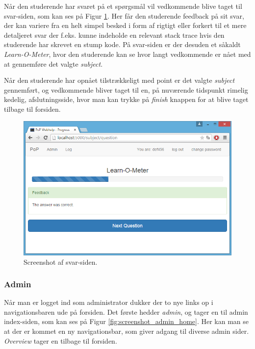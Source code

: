 \documentclass[11pt, a4paper]{article}
\begin{document}
Når den studerende har svaret på et spørgsmål vil vedkommende blive taget til svar-siden, som kan ses på Figur \ref{fig:screenshot_answer}. Her får den studerende feedback på sit svar, der kan variere fra en helt simpel besked i form af rigtigt eller forkert til et mere detaljeret svar der f.eks. kunne indeholde en relevant stack trace hvis den studerende har skrevet en stump kode. På svar-siden er der desuden et såkaldt \emph{Learn-O-Meter}, hvor den studerende kan se hvor langt vedkommende er nået med at gennemføre det valgte \emph{subject}.

Når den studerende har opnået tilstrækkeligt med point er det valgte \emph{subject} gennemført, og vedkommende bliver taget til en, på nuværende tidspunkt rimelig kedelig, afslutningsside, hvor man kan trykke på \emph{finish} knappen for at blive taget tilbage til forsiden.

\begin{figure}[htpb]
    \centering
    \includegraphics[width=1\linewidth]{figures/interface/answer.png}
    \caption{Screenshot af svar-siden.}
    \label{fig:screenshot_answer}
\end{figure}

\FloatBarrier

\subsubsection{Admin}
\label{subsub:screenshots_admin}
Når man er logget ind som administrator dukker der to nye links op i navigationsbaren ude på forsiden. Det første hedder \emph{admin}, og tager en til admin index-siden, som kan ses på Figur \ref{fig:screenshot_admin_home}. Her kan man se at der er kommet en ny navigationsbar, som giver adgang til diverse admin sider. \emph{Overview} tager en tilbage til forsiden.
\end{document}
